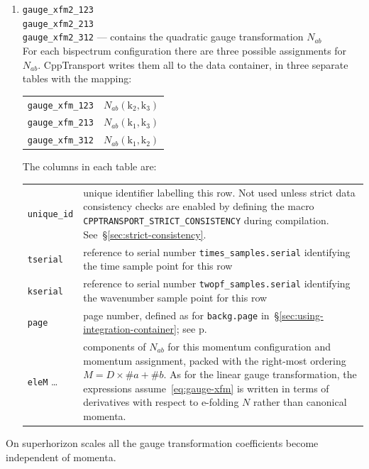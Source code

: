 \documentclass[11pt,a4paper]{article}
\newcommand{\vect}[1]{\bm{\mathrm{{#1}}}}
\newcommand{\packagefont}{\sffamily}
\newcommand{\CppTransport}{{\packagefont CppTransport}}
\newenvironment{sqltablelist}{\renewcommand{\arraystretch}{1.3}\small}{}
\begin{document}
\begin{sqltablelist}
\begin{enumerate}
	\item \texttt{gauge_xfm2_123} \\
    \texttt{gauge_xfm2_213} \\
    \texttt{gauge_xfm2_312} --- contains the quadratic gauge transformation $N_{ab}$ \\
    For each bispectrum configuration there are three possible assignments
    for $N_{ab}$.
    {\CppTransport} writes them all to the data container, in three separate tables
    with the mapping: \\
    \begin{tabular}{p{2.5cm}p{11.5cm}}
    	\texttt{gauge_xfm_123} & $N_{ab}(\vect{k}_2, \vect{k}_3)$ \\
    	\texttt{gauge_xfm_213} & $N_{ab}(\vect{k}_1, \vect{k}_3)$ \\
    	\texttt{gauge_xfm_312} & $N_{ab}(\vect{k}_1, \vect{k}_2)$
    \end{tabular}
	The columns in each table are: \\
	\begin{tabular}{p{2.5cm}p{11.5cm}}
        \texttt{unique_id} & unique identifier labelling this row. Not used
        unless strict data consistency checks are enabled
        by defining the macro
        \texttt{CPPTRANSPORT_STRICT_CONSISTENCY} during
        compilation. See~\S\ref{sec:strict-consistency}. \\
		\texttt{tserial} & reference to serial number \texttt{times_samples.serial}
        identifying the time sample point for this row \\
        \texttt{kserial} & reference to serial number \texttt{twopf_samples.serial}
        identifying the wavenumber sample point for this row \\
        \texttt{page} & page number, defined as for \texttt{backg.page}
        in~\S\ref{sec:using-integration-container}; see p.\pageref{sqltable:backg} \\
        \texttt{eleM} \ldots & components of $N_{ab}$ for this
        momentum configuration and momentum assignment, packed with the right-most
        ordering $M = D \times \#a + \#b$.
        As for the linear gauge transformation, the expressions assume~\eqref{eq:gauge-xfm}
        is written in terms of derivatives with respect to e-folding $N$
        rather than canonical momenta.
	\end{tabular}
\end{enumerate}	
\end{sqltablelist}
On superhorizon scales all the gauge transformation coefficients become independent of
momenta.
\end{document}

